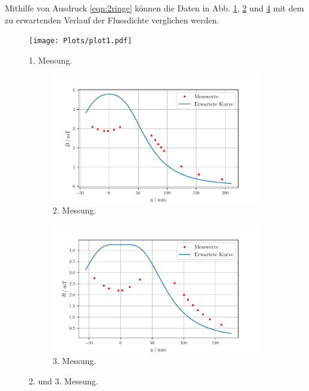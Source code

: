 Mithilfe von Ausdruck \eqref{eqn:2ringe} können die Daten in Abb. \ref{fig:1mess}, \ref{fig:2mess} und \ref{fig:3mess}  mit dem zu erwartenden Verlauf der Flussdichte verglichen werden.
\begin{figure}
    \centering
    \texttt{[image: Plots/plot1.pdf]}
    \caption{1. Messung.}
    \label{fig:1mess}
\end{figure}
\begin{figure}
    \centering
    \begin{subfigure}{0.48\textwidth}
        \centering
        \includegraphics[max width=1.1\linewidth]{Plots/plot2.pdf}
        \caption{2. Messung.}
        \label{fig:2mess}
    \end{subfigure}
    \begin{subfigure}{{0.48\textwidth}}
        \centering
        \includegraphics[max width=1.1\linewidth]{Plots/plot3.pdf}
        \caption{3. Messung.}
        \label{fig:3mess}
    \end{subfigure}
    \caption{2. und 3. Messung.}
\end{figure}
\pagebreak
